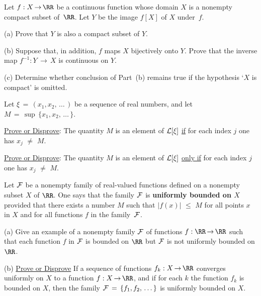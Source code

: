 \V
\V

\noindent \ExFh Let $f:X \,{\rightarrow}\, {\RR}$ be a continuous function whose domain $X$ is a nonempty compact subset of~${\RR}$.
    Let $Y$ be the image $f[X]$ of $X$ under~$f$.

\V

        (a) Prove that $Y$ is also a compact subset of $Y$.

\V

        (b) Suppose that, in addition, $f$ maps $X$ bijectively onto $Y$. Prove that the inverse map $f^{-1}:Y \,{\rightarrow}\, X$ is continuous on $Y$.

\V

        (c) Determine whether conclusion of Part~(b) remains true if the hypothesis `$X$ is compact' is omitted.

\V
\V

\noindent \ExFi Let ${\xi} \,=\, (x_{1},x_{2},\,{\ldots}\,)$ be a sequence of real numbers, and let $M \,=\, {\sup}\,\{x_{1},x_{2},\,{\ldots}\,\}$.

\V

        \underline{Prove or Disprove}: The quantity $M$ is an element of ${\cal L}[{\xi}]$ \underline{if} for each index $j$ one has $x_{j} \,\,{\neq}\,\, M$.

\V

        \underline{Prove or Disprove}: The quantity $M$ is an element of ${\cal L}[{\xi}]$ \underline{only if} for each index $j$ one has $x_{j} \,\,{\neq}\,\, M$.


\V
\V


\noindent {} Let ${\cal F}$ be a nonempty family of real-valued functions defined on a nonempty subset $X$ of ${\RR}$.
    One says that the family ${\cal F}$ is {\bf uniformly bounded on $X$} provided that there exists a number $M$ such that $|f(x)|\,\,{\leq}\,\,M$ for all points $x$ in $X$ and for all functions $f$ in the family~${\cal F}$.

\V

        (a) Give an example of a nonempty family ${\cal F}$ of functions $f:{\RR} \,{\rightarrow}\, {\RR}$ such that each function $f$ in ${\cal F}$ is bounded on ${\RR}$ but ${\cal F}$ is not uniformly bounded on ${\RR}$.

\V

        (b) \underline{Prove or Disprove} If a sequence of functions $f_{k}:X \,{\rightarrow}\, {\RR}$ converges uniformly on $X$ to a function $f:X \,{\rightarrow}\, {\RR}$,
    and if for each $k$ the function $f_{k}$ is bounded on $X$, then the family ${\cal F} \,=\, \{f_{1},f_{2},\,{\ldots}\,\}$ is uniformly bounded on $X$.


